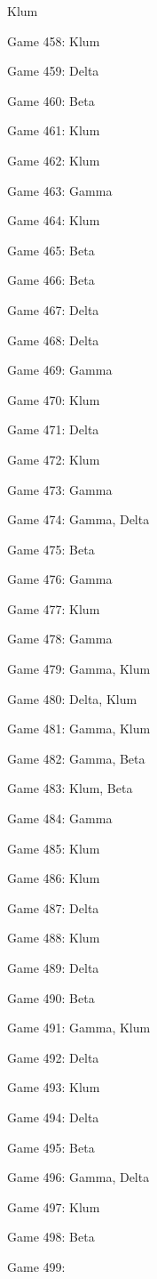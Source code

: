 \documentclass{article}
\begin{document}
\begin{multicols}{3}
\begin{compactitem}
Klum
\item Game 458:
Klum
\item Game 459:
Delta
\item Game 460:
Beta
\item Game 461:
Klum
\item Game 462:
Klum
\item Game 463:
Gamma
\item Game 464:
Klum
\item Game 465:
Beta
\item Game 466:
Beta
\item Game 467:
Delta
\item Game 468:
Delta
\item Game 469:
Gamma
\item Game 470:
Klum
\item Game 471:
Delta
\item Game 472:
Klum
\item Game 473:
Gamma
\item Game 474:
Gamma, Delta
\item Game 475:
Beta
\item Game 476:
Gamma
\item Game 477:
Klum
\item Game 478:
Gamma
\item Game 479:
Gamma, Klum
\item Game 480:
Delta, Klum
\item Game 481:
Gamma, Klum
\item Game 482:
Gamma, Beta
\item Game 483:
Klum, Beta
\item Game 484:
Gamma
\item Game 485:
Klum
\item Game 486:
Klum
\item Game 487:
Delta
\item Game 488:
Klum
\item Game 489:
Delta
\item Game 490:
Beta
\item Game 491:
Gamma, Klum
\item Game 492:
Delta
\item Game 493:
Klum
\item Game 494:
Delta
\item Game 495:
Beta
\item Game 496:
Gamma, Delta
\item Game 497:
Klum
\item Game 498:
Beta
\item Game 499:

\end{compactitem}
\end{multicols}
\end{document}
